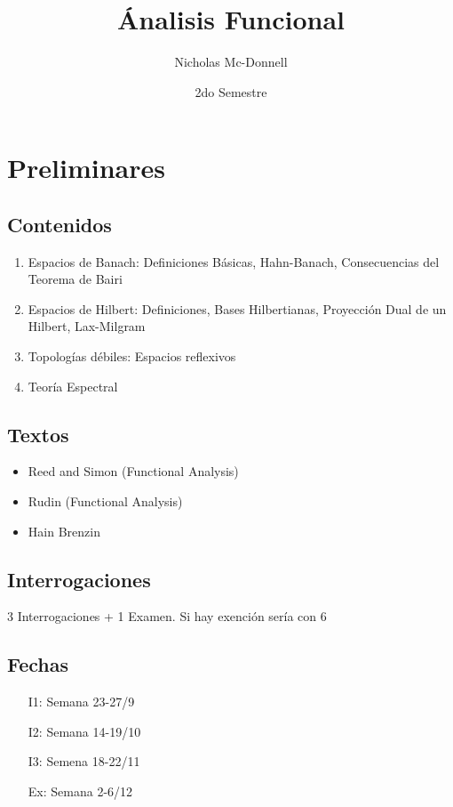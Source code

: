 \documentclass{notetaking}
\title{Ánalisis Funcional}
\author{Nicholas Mc-Donnell}
\date{2do Semestre}
\begin{document}
\maketitle
\tableofcontents
\newpage

\section*{Preliminares}

\subsection*{Contenidos}
\begin{enumerate}
    \item Espacios de Banach: Definiciones Básicas, Hahn-Banach, Consecuencias del Teorema de Bairi
    \item Espacios de Hilbert: Definiciones, Bases Hilbertianas, Proyección Dual de un Hilbert, Lax-Milgram
    \item Topologías débiles: Espacios reflexivos
    \item Teoría Espectral
\end{enumerate}

\subsection*{Textos}
\begin{itemize}
    \item Reed and Simon (Functional Analysis)
    \item Rudin (Functional Analysis)
    \item Hain Brenzin
\end{itemize}

\subsection*{Interrogaciones}
3 Interrogaciones + 1 Examen. Si hay exención sería con 6

\subsection*{Fechas}
\begin{itemize}
    \item[I1:] Semana 23-27/9
    \item[I2:] Semana 14-19/10
    \item[I3:] Semena 18-22/11
    \item[Ex:] Semana 2-6/12
\end{itemize}
\newpage
\end{document}

